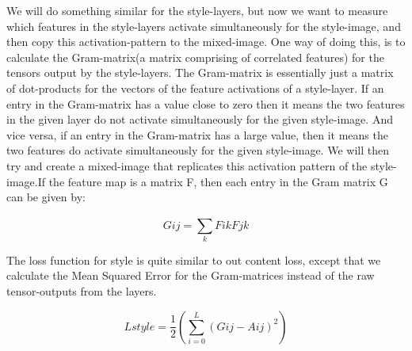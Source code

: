 \begin{styletransfer}
    We will do something similar for the style-layers, but now we want to measure which features in the style-layers activate simultaneously for the style-image, and then copy this activation-pattern to the mixed-image. One way of doing this, is to calculate the Gram-matrix(a matrix comprising of correlated features) for the tensors output by the style-layers. The Gram-matrix is essentially just a matrix of dot-products for the vectors of the feature activations of a style-layer.
    If an entry in the Gram-matrix has a value close to zero then it means the two features in the given layer do not activate simultaneously for the given style-image. And vice versa, if an entry in the Gram-matrix has a large value, then it means the two features do activate simultaneously for the given style-image. We will then try and create a mixed-image that replicates this activation pattern of the style-image.If the feature map is a matrix F, then each entry in the Gram matrix G can be given by:
    
   \[ Gij = \sum_{k}^{ } Fik Fjk \]

    The loss function for style is quite similar to out content loss, except that we calculate the Mean Squared Error for the Gram-matrices instead of the raw tensor-outputs from the layers.

    
   \[Lstyle = \frac{1}{2}  \left ( \sum_{i=0}^{L} \left ( Gij - Aij \right )^{2} \right )\]


\end{styletransfer}

